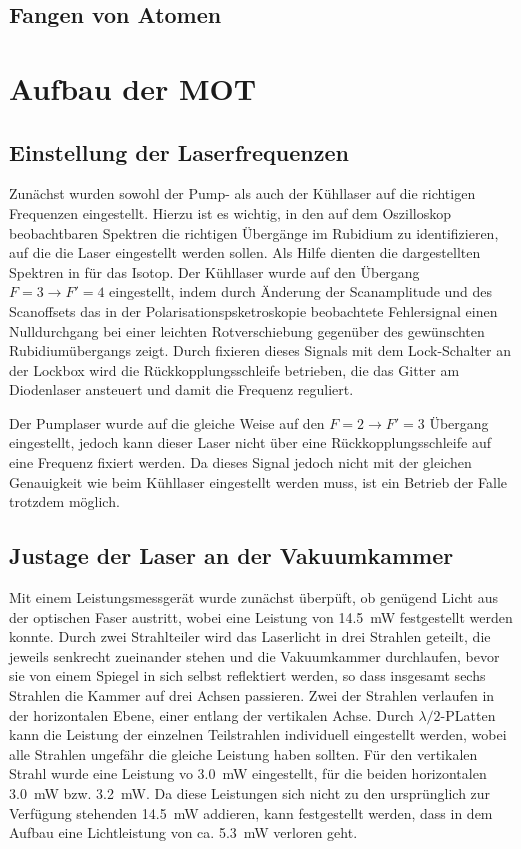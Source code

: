 \documentclass[11pt, a4paper]{article}
\numberwithin{equation}{section}
\begin{document}
\subsection{Fangen von Atomen}



\section{Aufbau der MOT}

\subsection{Einstellung der Laserfrequenzen}

Zunächst wurden sowohl der Pump- als auch der Kühllaser auf die richtigen Frequenzen eingestellt.
Hierzu ist es wichtig, in den auf dem Oszilloskop beobachtbaren Spektren die richtigen Übergänge im Rubidium zu identifizieren, auf die die Laser eingestellt werden sollen.
Als Hilfe dienten die dargestellten Spektren in \cite{anleitung} für das  Isotop.
Der Kühllaser wurde auf den Übergang $F=3 \rightarrow F\prime=4$ eingestellt, indem durch Änderung der Scanamplitude und des Scanoffsets das in der Polarisationspsketroskopie beobachtete Fehlersignal einen Nulldurchgang bei einer leichten Rotverschiebung gegenüber des gewünschten Rubidiumübergangs zeigt.
Durch fixieren dieses Signals mit dem Lock-Schalter an der Lockbox wird die Rückkopplungsschleife betrieben, die das Gitter am Diodenlaser ansteuert und damit die Frequenz reguliert.

Der Pumplaser wurde auf die gleiche Weise auf den $F=2 \rightarrow F\prime=3$ Übergang eingestellt, jedoch kann dieser Laser nicht über eine Rückkopplungsschleife auf eine Frequenz fixiert werden.
Da dieses Signal jedoch nicht mit der gleichen Genauigkeit wie beim Kühllaser eingestellt werden muss, ist ein Betrieb der Falle trotzdem möglich.

\subsection{Justage der Laser an der Vakuumkammer}

Mit einem Leistungsmessgerät wurde zunächst überpüft, ob genügend Licht aus der optischen Faser austritt, wobei eine Leistung von \SI{14,5}{mW} festgestellt werden konnte.
Durch zwei Strahlteiler wird das Laserlicht in drei Strahlen geteilt, die jeweils senkrecht zueinander stehen und die Vakuumkammer durchlaufen, bevor sie von einem Spiegel in sich selbst reflektiert werden, so dass insgesamt sechs Strahlen die Kammer auf drei Achsen passieren.
Zwei der Strahlen verlaufen in der horizontalen Ebene, einer entlang der vertikalen Achse.
Durch $\lambda/2$-PLatten kann die Leistung der einzelnen Teilstrahlen individuell eingestellt werden, wobei alle Strahlen ungefähr die gleiche Leistung haben sollten.
Für den vertikalen Strahl wurde eine Leistung vo \SI{3,0}{mW} eingestellt, für die beiden horizontalen \SI{3,0}{mW} bzw. \SI{3,2}{mW}.
Da diese Leistungen sich nicht zu den ursprünglich zur Verfügung stehenden \SI{14,5}{mW} addieren, kann festgestellt werden, dass in dem Aufbau eine Lichtleistung von ca. \SI{5,3}{mW} verloren geht.
\end{document}
